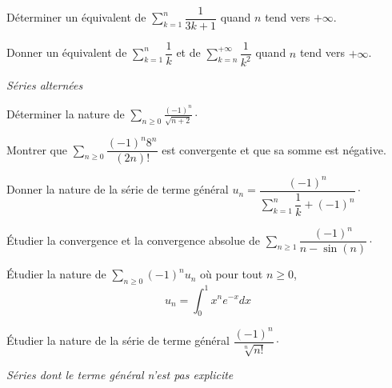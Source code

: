 \documentclass[a4paper,twoside,french,11pt]{VcCours}
\newcommand{\Sum}[2]{\ensuremath{\textstyle{\sum\limits_{#1}^{#2}}}}
\begin{document}
\begin{Exercice} Déterminer un équivalent de $\Sum{k=1}n \dfrac{1}{3k+1}$ quand $n$ tend vers $+ \infty$.
\end{Exercice}

\begin{Exercice} Donner un équivalent de $\Sum{k=1}n \dfrac{1}{k}$ et de $\Sum{k=n}{+ \infty} \dfrac{1}{k^2}$ quand $n$ tend vers $+ \infty$.
\end{Exercice} 

\medskip

\begin{center}
\textit{{ {\large Séries alternées}}}
\end{center}

\medskip

\begin{Exercice} Déterminer la nature de $\Sum{n \geq 0}{} \frac{(-1)^n}{\sqrt{n+2}}\cdot$
\end{Exercice}

\begin{Exercice}[$\bigstar$] Montrer que $\Sum{n \geq 0}{} {\dfrac{( - 1)^n 8^n}{(2n)!}}$ est convergente et que sa somme est négative. \end{Exercice}

\begin{Exercice}[$\bigstar$] Donner la nature de la série de terme général $u_n = \dfrac{(-1)^n}{\Sum{k=1}{n} \dfrac{1}{k} + (-1)^n} \cdot$
\end{Exercice}

\begin{Exercice} Étudier la convergence et la convergence absolue de $\Sum{n \geq 1}{} \dfrac{(-1)^n}{n-\sin(n)}\cdot$
\end{Exercice}

\begin{Exercice} Étudier la nature de $\Sum{n \geq 0}{} (-1)^n u_n$ où pour tout $n \geq 0$,
\vspace{-0.4cm}
$$ u_n = \int_{0}^1 x^n e^{-x} dx$$
\end{Exercice}

\begin{Exercice}[$\bigstar$] 
	Étudier la nature de la série de terme général $\dfrac{(-1)^n}{\sqrt[n]{n!}} \cdot$
\end{Exercice}



\medskip

\begin{center}
\textit{{ {\large Séries dont le terme général n'est pas explicite}}}
\end{center}
\end{document}
